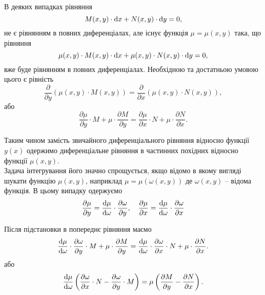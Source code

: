 В деяких випадках рівняння
\begin{equation*}
	M(x, y) \cdot \mathop{}\!\mathrm{d} x + N(x, y) \cdot \mathop{}\!\mathrm{d} y = 0,
\end{equation*}
не є рівнянням в повних диференціалах, але існує функція $\mu = \mu(x,y)$ така, що рівняння
\begin{equation*}
	\mu(x,y) \cdot M(x, y) \cdot \mathop{}\!\mathrm{d} x + \mu(x,y) \cdot N(x, y) \cdot \mathop{}\!\mathrm{d} y = 0,
\end{equation*}
вже буде рівнянням в повних диференціалах. Необхідною та достатньою умовою цього є рівність
\begin{equation*}
	\frac{\partial}{\partial y} (\mu(x,y) \cdot M(x, y)) = \frac{\partial}{\partial x} (\mu(x,y) \cdot N(x, y)),
\end{equation*}
або
\begin{equation*}
	\frac{\partial \mu}{\partial y} \cdot M + \mu \cdot \frac{\partial M}{\partial y} = \frac{\partial \mu}{\partial x} \cdot N + \mu \cdot \frac{\partial N}{\partial x}.
\end{equation*}

Таким чином замість звичайного диференціального рівняння відносно функції $y(x)$ одержимо диференціальне рівняння в частинних похідних відносно функції $\mu(x, y)$. \\

Задача інтегрування його значно спрощується, якщо відомо в якому вигляді шукати функцію $\mu(x,y)$, наприклад $\mu = \mu(\omega(x,y))$ де $\omega(x,y)$ -- відома функція. В цьому випадку одержуємо
\begin{equation*}
	\frac{\partial \mu}{\partial y} = \frac{\mathop{}\!\mathrm{d} \mu}{\mathop{}\!\mathrm{d} \omega} \cdot \frac{\partial \omega}{\partial y}, \quad \frac{\partial \mu}{\partial x} = \frac{\mathop{}\!\mathrm{d} \mu}{\mathop{}\!\mathrm{d} \omega} \cdot \frac{\partial \omega}{\partial x}
\end{equation*}

Після підстановки в попереднє рівняння маємо
\begin{equation*}
	\frac{\mathop{}\!\mathrm{d} \mu}{\mathop{}\!\mathrm{d} \omega} \cdot \frac{\partial \omega}{\partial y} \cdot M + \mu \cdot \frac{\partial M}{\partial y} = \frac{\mathop{}\!\mathrm{d} \mu}{\mathop{}\!\mathrm{d} \omega} \cdot \frac{\partial \omega}{\partial x} \cdot N + \mu \cdot \frac{\partial N}{\partial x}.
\end{equation*}
або
\begin{equation*}
	\frac{\mathop{}\!\mathrm{d} \mu}{\mathop{}\!\mathrm{d} \omega} \left( \frac{\partial \omega}{\partial x} \cdot N - \frac{\partial \omega}{\partial y} \cdot M \right) = \mu \left( \frac{\partial M}{\partial y} - \frac{\partial N}{\partial x} \right).
\end{equation*}

